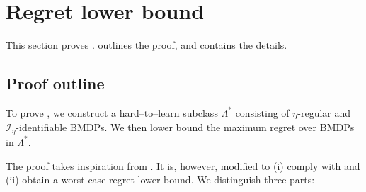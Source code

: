 \documentclass[11pt]{article}
\newcommand{\mcI}{\mathcal{I}}
\theoremstyle{definition}
\theoremstyle{definition}
\begin{document}
\section{Regret lower bound}
\label{sec:regret_lower_bound}

This section proves .
 outlines the proof, and  contains the details.

\subsection{Proof outline}
\label{sec:proof_outline_lower_bound}

To prove , we construct a hard--to--learn subclass $\Lambda^*$ consisting of $\eta$-regular and $\mcI_{\eta}$-identifiable \glspl{BMDP}.
We then lower bound the maximum regret over \glspl{BMDP} in $\Lambda^*$.

The proof takes inspiration from \cite[Theorem 5]{Jedra:2022}.
It is, however, modified to
(i) comply with  and
(ii) obtain a worst-case regret lower bound.
We distinguish three parts:
\end{document}
